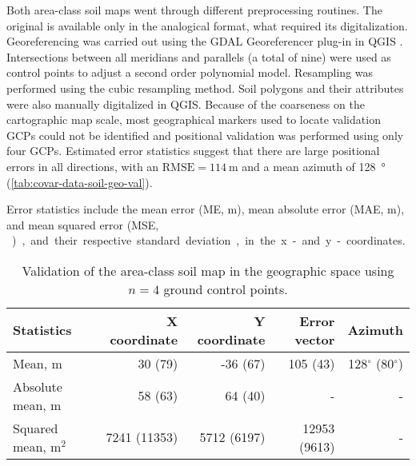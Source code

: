 Both area-class soil maps went through different preprocessing routines. The original \soilOld{} is available 
only in the analogical format, what required its digitalization. Georeferencing was carried out using the GDAL 
Georeferencer plug-in in QGIS \cite{GDAL2013, QGIS2013}. Intersections between all meridians and parallels (a 
total of nine) were used as control points to adjust a second order polynomial model. Resampling was performed 
using the cubic resampling method. Soil polygons and their attributes were also manually digitalized in QGIS. 
Because of the coarseness on the cartographic map scale, most geographical markers used to locate validation 
GCPs could not be identified and positional validation was performed using only four GCPs. Estimated error 
statistics suggest that there are large positional errors in all directions, with an $\text{RMSE} = 
\SI{114}{\m}$ and a mean azimuth of \SI{128}{\degree} (\autoref{tab:covar-data-soil-geo-val}).

Error statistics include the mean error (ME, \si{\m}), mean absolute error (MAE, \si{m}), and mean squared 
error (MSE, \si{\m\square}), and their respective standard deviation, in the x- and y-coordinates. 

\begin{table}[ht]
 \caption{Validation of the area-class soil map \soilOld{} in the geographic space using $n = 4$ ground 
 control points. }
 \label{tab:covar-data-soil-geo-val}
 \centering
 {\small
 \begin{tabular}{lrrrr}
  \hline
  Statistics           & X coordinate & Y coordinate & Error vector & Azimuth                  \\
  \hline
  Mean, m              & 30   (79)    & -36  (67)    & 105   (43)   & 128$^\circ$ (80$^\circ$) \\ 
  Absolute mean, m     & 58   (63)    & 64   (40)    & -            & -                        \\ 
  Squared mean, m$^2$  & 7241 (11353) & 5712 (6197)  & 12953 (9613) & -                        \\ 
  \hline
 \end{tabular}}
\end{table}


